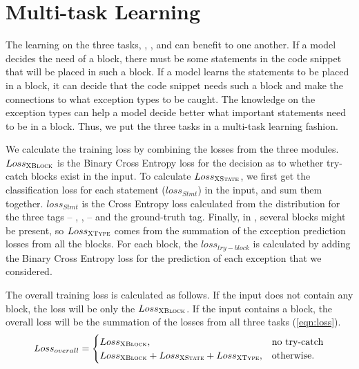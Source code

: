 \section{Multi-task Learning}
\label{sec:multitasking}

The learning on the three tasks, {\xblock}, {\xstate}, and {\xtype}
can benefit to one another. If a model decides the need
of a  block, there must be some statements in the code
snippet that will be placed in such a block. If a model learns the
statements to be placed in a  block, it can decide
that the code snippet needs such a block and make the connections to
what exception types to be caught. The knowledge on the exception
types can help a model decide better what important statements need to
be in a  block. Thus, we put the three tasks
in a multi-task learning fashion.


We calculate the training loss by combining the losses from the three
modules. $Loss_{{\textsc{XBlock}}}$ is the Binary Cross Entropy loss for the
decision as to whether try-catch blocks exist in the input. To
calculate $Loss_{{\textsc{XState}}}$, we first get the classification loss for
each statement ($loss_{Stmt}$) in the input, and sum them
together. $loss_{Stmt}$ is the Cross Entropy loss calculated from the
distribution for the three tags -- , ,
 -- and the ground-truth tag. Finally, in \xtype, several
 blocks might be present, so $Loss_{{\textsc{XType}}}$ comes
from the summation of the exception prediction losses from all the
 blocks. For each  block, the
$loss_{try-block}$ is calculated by adding the Binary Cross Entropy
loss for the prediction of each exception that we considered.

The overall training loss is calculated as follows. If the input does
not contain any  block, the loss will be only the
$Loss_{{\textsc{XBlock}}}$. If the input contains a  block,
the overall loss will be the summation of the losses from all
three tasks (\ref{eqn:loss}).
\begin{equation}
\label{eqn:loss}
Loss_{overall} =
\begin{cases}
Loss_{{\textsc{XBlock}}},  & \text{no try-catch}\\
Loss_{{\textsc{XBlock}}} + Loss_{{\textsc{XState}}} + Loss_{{\textsc{XType}}}, &\text{otherwise.}
\end{cases}
\end{equation}

